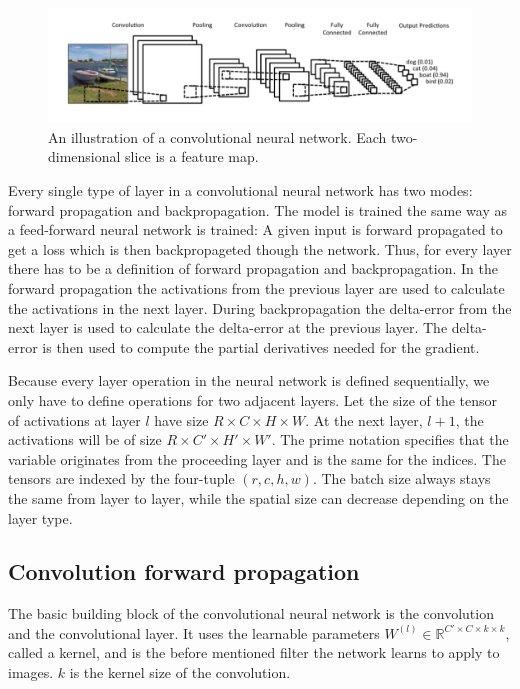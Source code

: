 \documentclass[a4paper, twoside]{article}
\begin{document}
\begin{figure}[h]
	\centering
  		\includegraphics[scale=0.6]{boatcnn.png}
  	\caption{An illustration of a convolutional neural network. Each two-dimensional slice is a feature map. \cite{figkonv}}\label{figboatcnn}
\end{figure}

Every single type of layer in a convolutional neural network has two modes: forward propagation and backpropagation. The model is trained the same way as a feed-forward neural network is trained: A given input is forward propagated to get a loss which is then backpropageted though the network. Thus, for every layer there has to be a definition of forward propagation and backpropagation. In the forward propagation the activations from the previous layer are used to calculate the activations in the next layer. During backpropagation the delta-error from the next layer is used to calculate the delta-error at the previous layer. The delta-error is then used to compute the partial derivatives needed for the gradient. \cite{cs231n} \cite{convmath}

Because every layer operation in the neural network is defined sequentially, we only have to define operations for two adjacent layers. Let the size of the tensor of activations at layer $l$ have size $R \times C \times H \times W$. At the next layer, $l+1$, the activations will be of size $R \times C' \times H' \times W'$. The prime notation specifies that the variable originates from the proceeding layer and is the same for the indices. The tensors are indexed by the four-tuple $(r, c, h, w)$. The batch size always stays the same from layer to layer, while the spatial size can decrease depending on the layer type. \cite{cs231n} \cite{convmath}

\subsection{Convolution forward propagation}
The basic building block of the convolutional neural network is the convolution and the convolutional layer. It uses the learnable parameters $W^{(l)} \in \mathbb{R}^{C' \times C  \times k \times k}$, called a kernel, and is the before mentioned filter the network learns to apply to images. $k$ is the kernel size of the convolution. \cite{cs231n}
\end{document}
